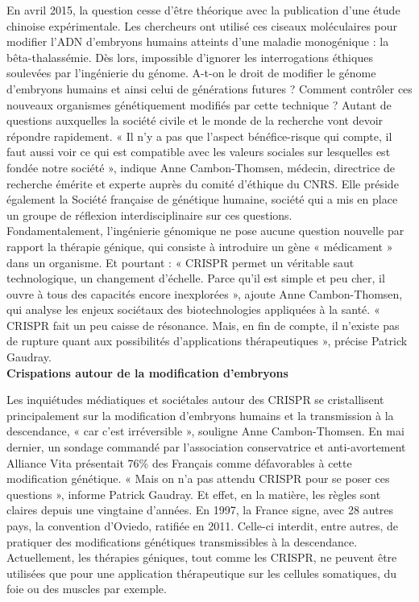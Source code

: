 \documentclass[8pt]{article}
\begin{document}
En avril 2015, la question cesse d’être théorique avec la publication d’une étude chinoise expérimentale. Les chercheurs ont utilisé ces ciseaux moléculaires pour modifier l’ADN d’embryons humains atteints d’une maladie monogénique : la bêta-thalassémie. Dès lors, impossible d’ignorer les interrogations éthiques soulevées par l’ingénierie du génome. A-t-on le droit de modifier le génome d’embryons humains et ainsi celui de générations futures ? Comment contrôler ces nouveaux organismes génétiquement modifiés par cette technique ? Autant de questions auxquelles la société civile et le monde de la recherche vont devoir répondre rapidement. « Il n’y a pas que l’aspect bénéfice-risque qui compte, il faut aussi voir ce qui est compatible avec les valeurs sociales sur lesquelles est fondée notre société », indique Anne Cambon-Thomsen, médecin, directrice de recherche émérite et experte auprès du comité d’éthique du CNRS. Elle préside également la Société française de génétique humaine, société qui a mis en place un groupe de réflexion interdisciplinaire sur ces questions. \\

Fondamentalement, l’ingénierie génomique ne pose aucune question nouvelle par rapport la thérapie génique, qui consiste à introduire un gène « médicament » dans un organisme. Et pourtant : « CRISPR permet un véritable saut technologique, un changement d’échelle. Parce qu’il est simple et peu cher, il ouvre à tous des capacités encore inexplorées », ajoute Anne Cambon-Thomsen, qui analyse les enjeux sociétaux des biotechnologies appliquées à la santé. « CRISPR fait un peu caisse de résonance. Mais, en fin de compte, il n’existe pas de rupture quant aux possibilités d’applications thérapeutiques », précise Patrick Gaudray. \\

\textbf{Crispations autour de la modification d’embryons}

Les inquiétudes médiatiques et sociétales autour des CRISPR se cristallisent principalement sur la modification d’embryons humains et la transmission à la descendance, « car c’est irréversible », souligne Anne Cambon-Thomsen. En mai dernier, un sondage commandé par l’association conservatrice et anti-avortement Alliance Vita présentait 76\% des Français comme défavorables à cette modification génétique. « Mais on n’a pas attendu CRISPR pour se poser ces questions », informe Patrick Gaudray. Et effet, en la matière, les règles sont claires depuis une vingtaine d’années. En 1997, la France signe, avec 28 autres pays, la convention d’Oviedo, ratifiée en 2011. Celle-ci interdit, entre autres, de pratiquer des modifications génétiques transmissibles à la descendance. Actuellement, les thérapies géniques, tout comme les CRISPR, ne peuvent être utilisées que pour une application thérapeutique sur les cellules somatiques, du foie ou des muscles par exemple. \\
\end{document}
